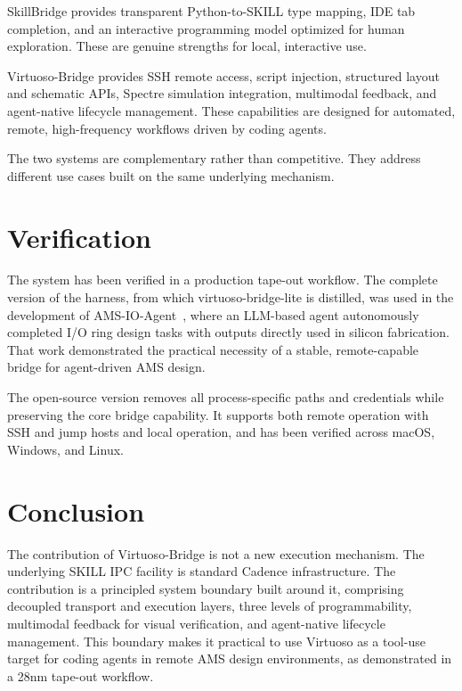 \documentclass[lettersize,journal]{ieee_template/IEEEtran}
\begin{document}
SkillBridge provides transparent Python-to-SKILL type mapping, IDE tab completion, and an interactive programming model optimized for human exploration. These are genuine strengths for local, interactive use.

Virtuoso-Bridge provides SSH remote access, script injection, structured layout and schematic APIs, Spectre simulation integration, multimodal feedback, and agent-native lifecycle management. These capabilities are designed for automated, remote, high-frequency workflows driven by coding agents.

The two systems are complementary rather than competitive. They address different use cases built on the same underlying mechanism.

\section{Verification}

The system has been verified in a production tape-out workflow. The complete version of the harness, from which virtuoso-bridge-lite is distilled, was used in the development of AMS-IO-Agent~\cite{amsioagent}, where an LLM-based agent autonomously completed I/O ring design tasks with outputs directly used in silicon fabrication. That work demonstrated the practical necessity of a stable, remote-capable bridge for agent-driven AMS design.

The open-source version removes all process-specific paths and credentials while preserving the core bridge capability. It supports both remote operation with SSH and jump hosts and local operation, and has been verified across macOS, Windows, and Linux.

\section{Conclusion}

The contribution of Virtuoso-Bridge is not a new execution mechanism. The underlying SKILL IPC facility is standard Cadence infrastructure. The contribution is a principled system boundary built around it, comprising decoupled transport and execution layers, three levels of programmability, multimodal feedback for visual verification, and agent-native lifecycle management. This boundary makes it practical to use Virtuoso as a tool-use target for coding agents in remote AMS design environments, as demonstrated in a 28nm tape-out workflow.
\end{document}
